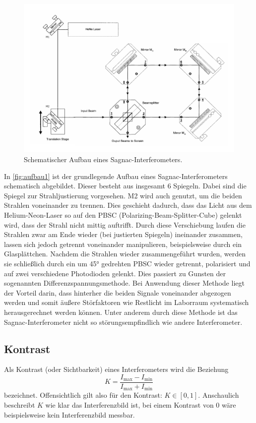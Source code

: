 \begin{figure}[h]
    \centering
    \includegraphics[width = 0.7 \linewidth]{pictures/aufbau1.pdf}
    \caption{Schematischer Aufbau eines Sagnac-Interferometers\cite{v64}.}
    \label{fig:aufbau1}
\end{figure}

In \autoref{fig:aufbau1} ist der grundlegende Aufbau eines Sagnac-Interferometers schematisch abgebildet.
Dieser besteht aus insgesamt 6 Spiegeln.
Dabei sind die Spiegel zur Strahljustierung vorgesehen.
M2 wird auch genutzt, um die beiden Strahlen voneinander zu trennen.
Dies geschieht dadurch, dass das Licht aus dem Helium-Neon-Laser so auf den PBSC (Polarizing-Beam-Splitter-Cube) gelenkt wird, 
dass der Strahl nicht mittig auftrifft.
Durch diese Verschiebung laufen die Strahlen zwar am Ende wieder (bei justierten Spiegeln) ineinander zusammen, 
lassen sich jedoch getrennt voneinander manipulieren, beispielsweise durch ein Glasplättchen.
Nachdem die Strahlen wieder zusammengeführt wurden, 
werden sie schließlich durch ein um 45° gedrehten PBSC wieder getrennt, polarisiert und auf zwei verschiedene Photodioden gelenkt.
Dies passiert zu Gunsten der sogenannten Differenzspannungsmethode.
Bei Anwendung dieser Methode liegt der Vorteil darin, 
dass hinterher die beiden Signale voneinander abgezogen werden und somit äußere Störfaktoren wie Restlicht im Laborraum systematisch herausgerechnet werden können.
Unter anderem durch diese Methode ist das Sagnac-Interferometer nicht so störungsempfindlich wie andere Interferometer. 

\subsection{Kontrast} \label{sec:kontrast}
Als Kontrast (oder Sichtbarkeit) eines Interferometers wird die Beziehung
\begin{equation} \label{eq:kontrast}
    K = \frac{I_\text{max} - I_\text{min}}{I_\text{max} + I_\text{min}}
\end{equation}
bezeichnet. Offensichtlich gilt also für den Kontrast: $K \in [0,1]$.
Anschaulich beschreibt $K$ wie klar das Interferenzbild ist, bei einem Kontrast von $0$ wäre beispielsweise kein Interferenzbild messbar.

